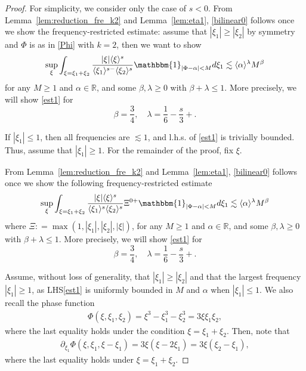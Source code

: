 \documentclass[%
11pt,  reqno]{amsart}
\newcommand{\fia}{\mathbbm{1}_{|\Phi-\alpha|<M}}
\newcommand{\jap}[1]{\langle #1 \rangle}
\newcommand{\5}{\textup{V}}
\newcommand{\noi}{\noindent}
\newcommand{\les}{\lesssim}
\theoremstyle{remark}
\newcommand{\R}{\mathbb{R}}
\newcommand{\al}{\alpha}
\newcommand{\be}{\beta}
\newcommand{\ld}{\lambda}
\numberwithin{equation}{section}
\numberwithin{theorem}{section}
\newcommand{\andreia}[1]{\marginpar{\color{purple} $\Leftarrow\Leftarrow\Leftarrow$}{\smallskip \noi\color{purple}ANDREIA: #1}\smallskip}
\begin{document}
\begin{proof}%


For simplicity, we consider only the case of $s<0$.
From Lemma~\ref{lem:reduction_fre_k2} and Lemma~\ref{lem:eta1}, \eqref{bilinear0} follows once we show the frequency-restricted estimate: assume that $|\xi_1| \ge |\xi_2|$ by symmetry and $\Phi$ is as in \eqref{Phi} with $k=2$, then we want to show
\begin{equation}
\label{est1}
\sup_{\xi} \int_{\xi=\xi_1+\xi_2}
\frac{|\xi|\jap{\xi}^s}{\jap{\xi_1}^{s-}\jap{\xi_2}^s}
\fia d\xi_1
\lesssim 
\jap{\al}^{\ld } M^{\be} 
\end{equation}
for any $M\ge 1$ and $\al\in\R$, and some $\be,\ld \ge 0$ with $\be+\ld \le 1$. More precisely, we will show \eqref{est1} for
$$
\beta=\frac34,\quad \lambda=\frac{1}{6}-\frac s3+. 
$$


If $|\xi_1| \le 1$, then all frequencies are $\les1$, and l.h.s. of \eqref{est1} is trivially bounded. Thus, assume that $|\xi_1| \ge 1$. 
For the remainder of the proof, fix $\xi$. 


\andreia{HERE}


From Lemma~\ref{lem:reduction_fre_k2} and Lemma~\ref{lem:eta1}, \eqref{bilinear0} follows once we show the following frequency-restricted estimate
\begin{equation}
\label{est1}
\sup_{\xi} \int_{\xi=\xi_1+\xi_2}
\frac{|\xi|\jap{\xi}^s}{\jap{\xi_1}^s\jap{\xi_2}^s}
\Xi^{0+}
\fia d\xi_1
\lesssim 
\jap{\al}^{\ld } M^{\be} 
\end{equation}
where $\Xi : = \max(1, |\xi_1|, |\xi_2|, |\xi|)$, 
for any $M\ge 1$ and $\al\in\R$, and some $\be,\ld \ge 0$ with $\be+\ld \le 1$. More precisely, we will show \eqref{est1} for
$$
\beta=\frac34,\quad \lambda=\frac{1}{6}-\frac s3+. 
$$


Assume, without loss of generality, that $|\xi_1|\ge |\xi_2|$ and that the largest frequency $|\xi_1| \ge 1$, as LHS\eqref{est1} is uniformly bounded in $M$ and $\al$ when $|\xi_1| \le 1$. We also recall the phase function 
\begin{align}
\label{phase2}
\Phi (\xi, \xi_1, \xi_2) = \xi^3 - \xi_1^3 - \xi_2^3 = 3 \xi \xi_1 \xi_2, 
\end{align}
where the last equality holds under the condition $\xi= \xi_1 + \xi_2$. Then, note that
\begin{align}
\label{phase2a}
\partial_{\xi_1} \Phi(\xi, \xi_1,\xi-\xi_1) 
= 
3 \xi (\xi -2 \xi_1)
= 
3 \xi(\xi_2 - \xi_1)
, 
\end{align}
where the last equality holds under $\xi = \xi_1+\xi_2$. 




\end{proof}
\end{document}
